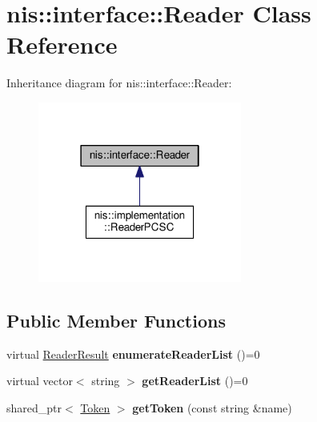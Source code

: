 \hypertarget{classnis_1_1interface_1_1Reader}{\section{nis\-:\-:interface\-:\-:Reader Class Reference}
\label{classnis_1_1interface_1_1Reader}
}


Inheritance diagram for nis\-:\-:interface\-:\-:Reader\-:
\nopagebreak
\begin{figure}[H]
\begin{center}
\leavevmode
\includegraphics[width=190pt]{classnis_1_1interface_1_1Reader__inherit__graph}
\end{center}
\end{figure}
\subsection*{Public Member Functions}
\begin{DoxyCompactItemize}
\item 
\hypertarget{classnis_1_1interface_1_1Reader_abf689da8251ccbf468c495ce9b6eb2e7}{virtual \hyperlink{nis__types_8h_a484156f5b8cf43396c5bbe77226fa8da}{Reader\-Result} {\bfseries enumerate\-Reader\-List} ()=0}\label{classnis_1_1interface_1_1Reader_abf689da8251ccbf468c495ce9b6eb2e7}

\item 
\hypertarget{classnis_1_1interface_1_1Reader_a65d1522165b9660c1c1be260af28cbd0}{virtual vector$<$ string $>$ {\bfseries get\-Reader\-List} ()=0}\label{classnis_1_1interface_1_1Reader_a65d1522165b9660c1c1be260af28cbd0}

\item 
\hypertarget{classnis_1_1interface_1_1Reader_a8132b33c794255154b626887af4a8795}{shared\-\_\-ptr$<$ \hyperlink{classnis_1_1interface_1_1Token}{Token} $>$ {\bfseries get\-Token} (const string \&name)}\label{classnis_1_1interface_1_1Reader_a8132b33c794255154b626887af4a8795}

\end{DoxyCompactItemize}
